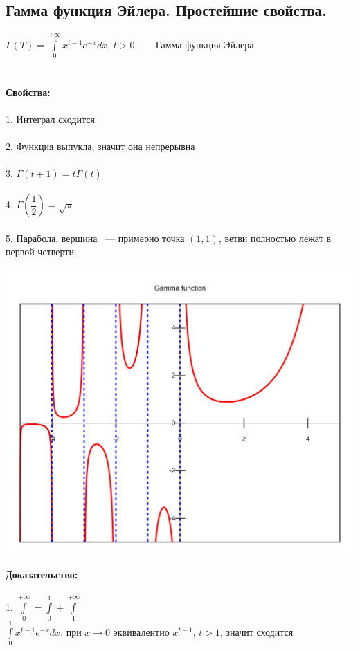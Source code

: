 \documentclass[../main.tex]{subfiles}
\begin{document}
\subsection{Гамма функция Эйлера. Простейшие свойства.}
$\Gamma(T) = \int\limits^{+\infty}_0 x^{t - 1} e^{-x} dx$, $t > 0$ ~--- Гамма функция Эйлера\\\\\\
\textbf{Свойства:}\\\\
1. Интеграл сходится\\\\
2. Функция выпукла, значит она непрерывна\\\\
3. $\Gamma(t + 1) = t \Gamma (t)$\\\\
4. $\Gamma \left( \dfrac{1}{2} \right) = \sqrt{\pi}$\\\\
5. Парабола, вершина ~--- примерно точка $(1, 1)$, ветви полностью лежат в первой четверти\\\\
\includegraphics[scale = 0.2]{Images/gamma plot.png}\\\\
\newpage
\textbf{Доказательство:}\\\\
1. $\int\limits^{+\infty}_0 = \int\limits^1_0 + \int\limits^{+\infty}_1$\\
$\int\limits^1_0 x^{t - 1} e^{-x} dx$, при $x \rightarrow 0$ эквивалентно $x^{t - 1}$, $t > 1$, значит сходится\\\\
\end{document}
